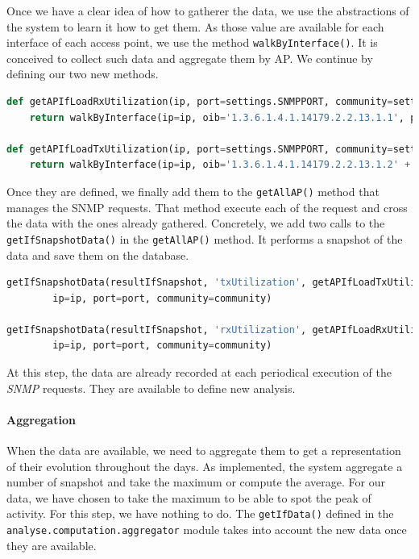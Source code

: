 Once we have a clear idea of how to gatherer the data, we use the abstractions of the system to learn it how to get them. As those value are available for each interface of each access point, we use the method \texttt{walkByInterface()}. It is conceived to collect such data and aggregate them by AP. We continue by defining our two new methods.\\
\begin{lstlisting}[language=Python, frame=single,breaklines=true,caption={Misleading Error Message}]
def getAPIfLoadRxUtilization(ip, port=settings.SNMPPORT, community=settings.SNMPCOMMUNITY, ap=''):
	return walkByInterface(ip=ip, oib='1.3.6.1.4.1.14179.2.2.13.1.1', port=port, community=community)

def getAPIfLoadTxUtilization(ip, port=settings.SNMPPORT, community=settings.SNMPCOMMUNITY, ap=''):
	return walkByInterface(ip=ip, oib='1.3.6.1.4.1.14179.2.2.13.1.2' + ap, port=port, community=community)
\end{lstlisting}

Once they are defined, we finally add them to the \texttt{getAllAP()} method that manages the SNMP requests. That method execute each of the request and cross the data with the ones already gathered. Concretely, we add two calls to the \texttt{getIfSnapshotData()} in the \texttt{getAllAP()} method. It performs a snapshot of the data and save them on the database.\\

\begin{lstlisting}[language=Python, frame=single,breaklines=true,caption={Misleading Error Message}]
getIfSnapshotData(resultIfSnapshot, 'txUtilization', getAPIfLoadTxUtilization, 
		ip=ip, port=port, community=community)

getIfSnapshotData(resultIfSnapshot, 'rxUtilization', getAPIfLoadRxUtilization, 
		ip=ip, port=port, community=community)		
\end{lstlisting}

At this step, the data are already recorded at each periodical execution of the \emph{SNMP} requests. They are available to define new analysis.

\paragraph*{Aggregation} When the data are available, we need to aggregate them to get a representation of their evolution throughout the days. As implemented, the system aggregate a number of snapshot and take the maximum or compute the average. For our data, we have chosen to take the maximum to be able to spot the peak of activity. For this step, we have nothing to do. The \texttt{getIfData()} defined in the \texttt{analyse.computation.aggregator} module takes into account the new data once they are available.


